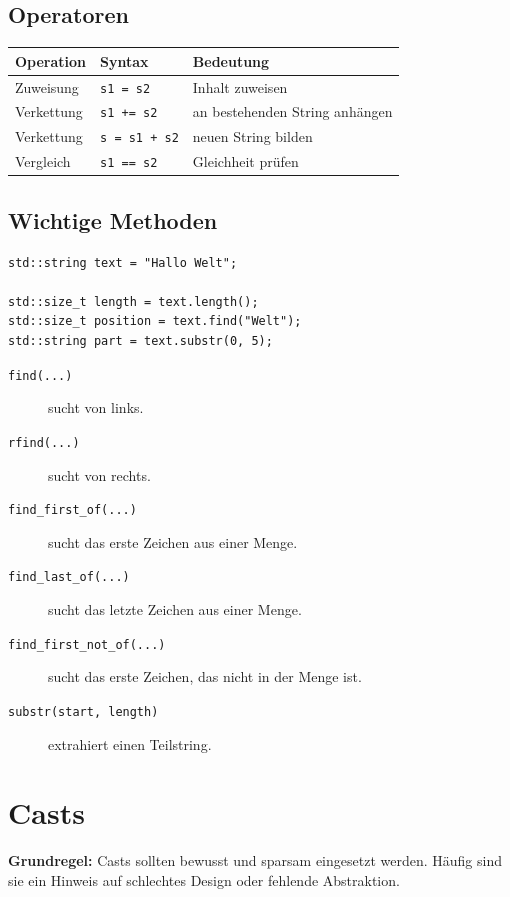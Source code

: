 \documentclass[11pt,a4paper]{article}
\newcommand{\code}[1]{\texttt{#1}}
\newcommand{\important}[1]{\textbf{#1}}
\begin{document}
\subsection{Operatoren}
\begin{center}
\begin{tabular}{lll}
\toprule
Operation & Syntax & Bedeutung \\
\midrule
Zuweisung & \code{s1 = s2} & Inhalt zuweisen \\
Verkettung & \code{s1 += s2} & an bestehenden String anhängen \\
Verkettung & \code{s = s1 + s2} & neuen String bilden \\
Vergleich & \code{s1 == s2} & Gleichheit prüfen \\
\bottomrule
\end{tabular}
\end{center}

\subsection{Wichtige Methoden}
\begin{lstlisting}[caption={String-Methoden}]
std::string text = "Hallo Welt";

std::size_t length = text.length();
std::size_t position = text.find("Welt");
std::string part = text.substr(0, 5);
\end{lstlisting}

\begin{description}
  \item[\code{find(...)}] sucht von links.
  \item[\code{rfind(...)}] sucht von rechts.
  \item[\code{find\_first\_of(...)}] sucht das erste Zeichen aus einer Menge.
  \item[\code{find\_last\_of(...)}] sucht das letzte Zeichen aus einer Menge.
  \item[\code{find\_first\_not\_of(...)}] sucht das erste Zeichen, das nicht in der Menge ist.
  \item[\code{substr(start, length)}] extrahiert einen Teilstring.
\end{description}

\section{Casts}

\important{Grundregel:} Casts sollten bewusst und sparsam eingesetzt werden. Häufig sind sie ein Hinweis auf schlechtes Design oder fehlende Abstraktion.
\end{document}
